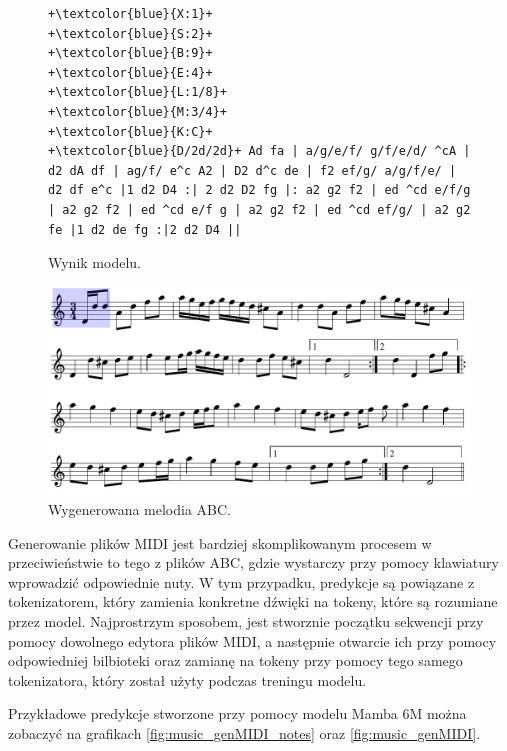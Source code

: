 \documentclass[data-science]{agh-wi} %
\begin{document}
\begin{figure}
    \begin{verbatim}
+\textcolor{blue}{X:1}+
+\textcolor{blue}{S:2}+
+\textcolor{blue}{B:9}+
+\textcolor{blue}{E:4}+
+\textcolor{blue}{L:1/8}+
+\textcolor{blue}{M:3/4}+
+\textcolor{blue}{K:C}+
+\textcolor{blue}{D/2d/2d}+ Ad fa | a/g/e/f/ g/f/e/d/ ^cA | d2 dA df | ag/f/ e^c A2 | D2 d^c de | f2 ef/g/ a/g/f/e/ | d2 df e^c |1 d2 D4 :| 2 d2 D2 fg |: a2 g2 f2 | ed ^cd e/f/g | a2 g2 f2 | ed ^cd e/f g | a2 g2 f2 | ed ^cd ef/g/ | a2 g2 fe |1 d2 de fg :|2 d2 D4 ||
    \end{verbatim}
    \caption{Wynik modelu.}\label{code:music_gen1}
\end{figure}


\begin{figure}[ht!]
    \begin{center}
        \includegraphics[width=0.9\linewidth]{./img/abc_gen_nice1.pdf}
    \end{center}
    \caption{Wygenerowana melodia ABC.}\label{fig:music_gen1}
\end{figure}

Generowanie plików MIDI jest bardziej skomplikowanym procesem w przeciwieństwie to tego z plików ABC, gdzie wystarczy przy pomocy klawiatury wprowadzić odpowiednie nuty. W tym przypadku, predykcje są powiązane z tokenizatorem, który zamienia konkretne dźwięki na tokeny, które są rozumiane przez model. Najprostrzym sposobem, jest stworznie początku sekwencji przy pomocy dowolnego edytora plików MIDI, a następnie otwarcie ich przy pomocy odpowiedniej bilbioteki oraz zamianę na tokeny przy pomocy tego samego tokenizatora, który został użyty podczas treningu modelu.

Przykładowe predykcje stworzone przy pomocy modelu Mamba 6M można zobaczyć na grafikach \ref*{fig:music_genMIDI_notes} oraz \ref*{fig:music_genMIDI}.
\end{document}
